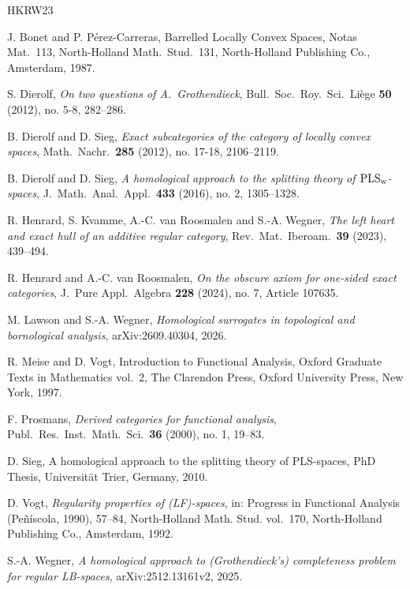 \documentclass[11pt, a4paper, reqno]{amsart}
\theoremstyle{definition}
\begin{document}
\begin{thebibliography}{HKRW23}

 J. Bonet and P. P\'erez-Carreras, Barrelled {L}ocally
  {C}onvex {S}paces, Notas Mat.~113, North-Holland Math.\ Stud.\ 131, North-Holland Publishing Co., Amsterdam, 1987.
  
 S. Dierolf, \emph{On two questions of A.\ Grothendieck}, Bull.\ Soc.\ Roy.\ Sci.\ Li\`ege \textbf{50} (2012), no. 5-8, 282--286.

 B. Dierolf and D. Sieg, \emph{Exact subcategories of the category of locally convex spaces}, Math.\ Nachr.\ \textbf{285} (2012), no. 17-18, 2106--2119.

 B. Dierolf and D. Sieg, \emph{A homological approach to the splitting theory of {$\rm PLS_w$}-spaces}, J.\ Math.\ Anal.\ Appl.\ \textbf{433} (2016), no. 2, 1305--1328.

 R. Henrard, S. Kvamme, A.-C. van Roosmalen and S.-A. Wegner, \emph{The left heart and exact hull of an additive regular category}, Rev.\ Mat.\ Iberoam.\ \textbf{39} (2023), 439--494.

 R. Henrard and A.-C. van Roosmalen, \emph{On the obscure axiom for one-sided exact categories}, J.\ Pure Appl.\ Algebra \textbf{228} (2024), no. 7, Article 107635.

 M. Lawson and S.-A. Wegner, \emph{Homological surrogates in topological and bornological analysis}, arXiv:2609.40304, 2026.

 R. Meise and D. Vogt, Introduction to {F}unctional {A}nalysis, Oxford Graduate Texts in Mathematics vol.~2, The Clarendon Press, Oxford University Press, New York, 1997.

 F. Prosmans, \emph{Derived categories for functional analysis}, Publ.\ Res.\ Inst.\ Math.\ Sci.\ \textbf{36} (2000), no. 1, 19--83.

 D. Sieg, A homological approach to the splitting theory of PLS-spaces, PhD Thesis, Universit\"at Trier, Germany, 2010.

 D. Vogt, \emph{Regularity properties of ({LF})-spaces}, in: Progress in Functional Analysis ({P}e\~n\'iscola, 1990), 57--84, North-Holland Math. Stud. vol.~170, North-Holland Publishing Co., Amsterdam, 1992.

 S.-A. Wegner, \emph{A homological approach to (Grothendieck's) completeness problem for regular LB-spaces}, arXiv:2512.13161v2, 2025.

\end{thebibliography}


%
%
\end{document}
